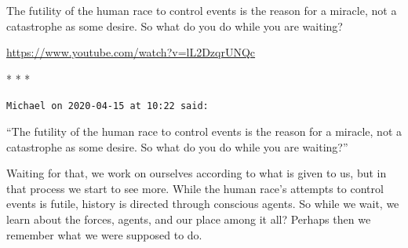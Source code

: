 The futility of the human race to control events is the reason for a miracle, not a catastrophe as some desire. So what do you do while you are waiting?

\url{https://www.youtube.com/watch?v=lL2DzqrUNQc} 


\begin{center}* * *\end{center}

\begin{footnotesize}
\begin{sffamily}
\texttt{Michael on 2020-04-15 at 10:22 said:}

``The futility of the human race to control events is the reason for a miracle, not a catastrophe as some desire. So what do you do while you are waiting?''

Waiting for that, we work on ourselves according to what is given to us, but in that process we start to see more. While the human race's attempts to control events is futile, history is directed through conscious agents. So while we wait, we learn about the forces, agents, and our place among it all? Perhaps then we remember what we were supposed to do.

\end{sffamily}
\end{footnotesize}

